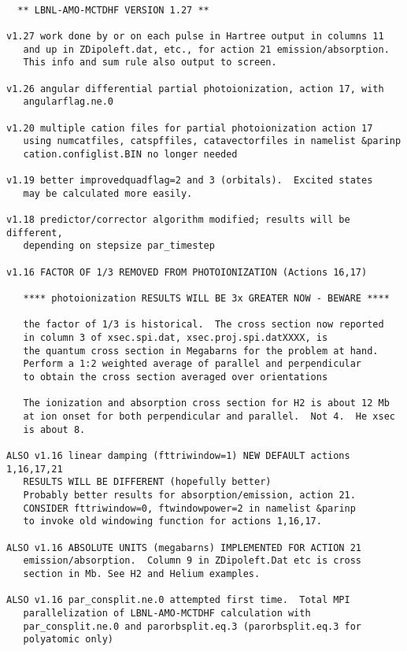 \begin{verbatim}

  ** LBNL-AMO-MCTDHF VERSION 1.27 **

v1.27 work done by or on each pulse in Hartree output in columns 11 
   and up in ZDipoleft.dat, etc., for action 21 emission/absorption.
   This info and sum rule also output to screen.

v1.26 angular differential partial photoionization, action 17, with
   angularflag.ne.0

v1.20 multiple cation files for partial photoionization action 17
   using numcatfiles, catspffiles, catavectorfiles in namelist &parinp
   cation.configlist.BIN no longer needed

v1.19 better improvedquadflag=2 and 3 (orbitals).  Excited states
   may be calculated more easily.

v1.18 predictor/corrector algorithm modified; results will be different,
   depending on stepsize par_timestep

v1.16 FACTOR OF 1/3 REMOVED FROM PHOTOIONIZATION (Actions 16,17)

   **** photoionization RESULTS WILL BE 3x GREATER NOW - BEWARE ****

   the factor of 1/3 is historical.  The cross section now reported
   in column 3 of xsec.spi.dat, xsec.proj.spi.datXXXX, is
   the quantum cross section in Megabarns for the problem at hand.
   Perform a 1:2 weighted average of parallel and perpendicular
   to obtain the cross section averaged over orientations

   The ionization and absorption cross section for H2 is about 12 Mb 
   at ion onset for both perpendicular and parallel.  Not 4.  He xsec
   is about 8.

ALSO v1.16 linear damping (fttriwindow=1) NEW DEFAULT actions 1,16,17,21
   RESULTS WILL BE DIFFERENT (hopefully better)
   Probably better results for absorption/emission, action 21.
   CONSIDER fttriwindow=0, ftwindowpower=2 in namelist &parinp
   to invoke old windowing function for actions 1,16,17.

ALSO v1.16 ABSOLUTE UNITS (megabarns) IMPLEMENTED FOR ACTION 21
   emission/absorption.  Column 9 in ZDipoleft.Dat etc is cross 
   section in Mb. See H2 and Helium examples.

ALSO v1.16 par_consplit.ne.0 attempted first time.  Total MPI 
   parallelization of LBNL-AMO-MCTDHF calculation with
   par_consplit.ne.0 and parorbsplit.eq.3 (parorbsplit.eq.3 for 
   polyatomic only)


\end{verbatim}
